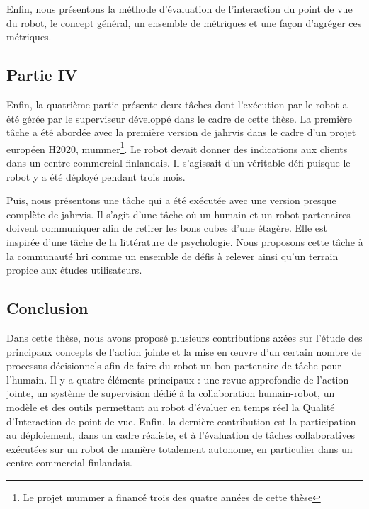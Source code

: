 Enfin, nous présentons la méthode d'évaluation de l'interaction du point de vue du robot, \ie le concept général, un ensemble de métriques et une façon d'agréger ces métriques. 
	
\subsection*{Partie IV}

Enfin, la quatrième partie présente deux tâches dont l'exécution par le robot a été gérée par le superviseur développé dans le cadre de cette thèse. La première tâche a été abordée avec la première version de \acrshort{jahrvis} dans le cadre d'un projet européen H2020, \acrfull{mummer}\footnote{Le projet \acrshort{mummer} a financé trois des quatre années de cette thèse}. Le robot devait donner des indications aux clients dans un centre commercial finlandais. Il s'agissait d'un véritable défi puisque le robot y a été déployé pendant trois mois.

Puis, nous présentons une tâche qui a été exécutée avec une version presque complète de \acrshort{jahrvis}. Il s'agit d'une tâche où un humain et un robot partenaires doivent communiquer afin de retirer les bons cubes d'une étagère. Elle est inspirée d'une tâche de la littérature de psychologie. Nous proposons cette tâche à la communauté \acrshort{hri} comme un ensemble de défis à relever ainsi qu'un terrain propice aux études utilisateurs.

\subsection*{Conclusion}
Dans cette thèse, nous avons proposé plusieurs contributions axées sur l'étude des principaux concepts de l'action jointe et la mise en œuvre d'un certain nombre de processus décisionnels afin de faire du robot un bon partenaire de tâche pour l'humain. Il y a quatre éléments principaux : une revue approfondie de l'action jointe, un système de supervision dédié à la collaboration humain-robot, un modèle et des outils permettant au robot d'évaluer en temps réel la Qualité d'Interaction de point de vue. Enfin, la dernière contribution est la participation au déploiement, dans un cadre réaliste, et à l'évaluation de tâches collaboratives exécutées sur un robot de manière totalement autonome, en particulier dans un centre commercial finlandais. 